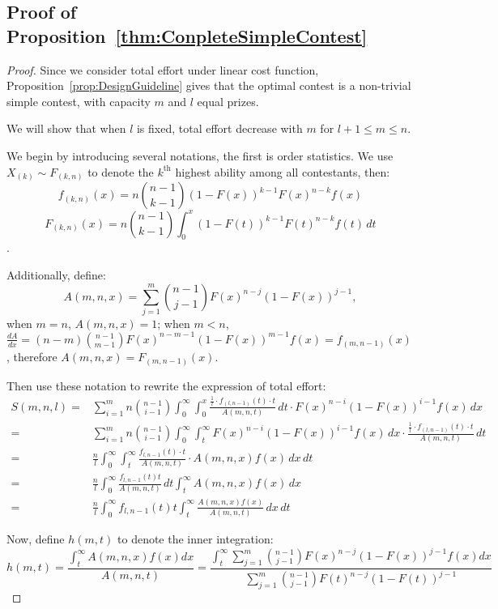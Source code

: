 \subsection*{Proof of Proposition~\ref{thm:ConpleteSimpleContest}}
\begin{proof}
    Since we consider total effort under linear cost function, Proposition~\ref{prop:DesignGuideline} gives that the optimal contest is a non-trivial simple contest, with capacity $m$ and $l$ equal prizes.

    We will show that when $l$ is fixed, total effort decrease with $m$ for $l+1\leq m\leq n$. 

    We begin by introducing several notations, the first is order statistics. We use $X_{(k)} \sim F_{(k,n)}$ to denote the $k^{\text{th}}$ highest ability among all contestants, then:
    $$f_{(k,n)}(x) = n \binom{n-1}{k-1} (1-F(x))^{k-1} F(x)^{n-k} f(x) $$
    $$F_{(k,n)}(x) = n \binom{n-1}{k-1} \int_0^x (1-F(t))^{k-1} F(t)^{n-k} f(t) \,dt $$.

    Additionally, define:
    \[
    A(m, n, x) = \sum_{j=1}^m \binom{n-1}{j-1} F(x)^{n-j} (1-F(x))^{j-1},
    \]when $m=n$, $A(m, n, x) = 1$; when $m<n$, $\frac{dA}{dx} = (n-m) \binom{n-1}{m-1} F(x)^{n-m-1} (1-F(x))^{m-1} f(x) = f_{(m,n-1)}(x)$, therefore $A(m, n, x) = F_{(m,n-1)}(x) $.

    Then use these notation to rewrite the expression of total effort:
    $$
\begin{aligned}   
S(m,n,l) = &\sum_{i=1}^m n\binom{n-1}{i-1} \int_0^{\infty} \int_0^{x} \frac{\frac{1}{l} \cdot f_{(l,n-1)}(t) \cdot t}{A(m,n,t)}\, dt \cdot F(x)^{n-i}(1-F(x))^{i-1}f(x)\,dx \\= &\sum_{i=1}^m n\binom{n-1}{i-1} \int_0^{\infty} \int_t^{\infty} F(x)^{n-i}(1-F(x))^{i-1}f(x)\,dx \cdot \frac{\frac{1}{l} \cdot f_{(l,n-1)}(t) \cdot t}{A(m,n,t)} \,dt \\=& \frac{n}{l} \int_0^{\infty} \int_t^{\infty} \frac{f_{l,n-1}(t) \cdot t}{A(m,n,t)} \cdot A(m,n,x)f(x)\,dx \,dt \\=& \frac{n}{l} \int_0^{\infty} \frac{f_{l,n-1}(t)t}{A(m,n,t)} \,dt \int_t^{\infty} A(m,n,x)f(x)\, dx \\
=& \frac{n}{l} \int_0^{\infty} f_{l,n-1}(t)t  \int_t^{\infty} \frac{A(m,n,x)f(x)}{A(m,n,t)}\, dx \, dt
\end{aligned}
$$

    Now, define $h(m,t)$ to denote the inner integration:
    \[
    h(m, t) = \frac{\int_t^\infty A(m, n, x) f(x) dx}{A(m, n, t)} = \frac{\int_t^\infty\sum_{j=1}^m \binom{n-1}{j-1} F(x)^{n-j} (1-F(x))^{j-1}f(x)dx}{\sum_{j=1}^m \binom{n-1}{j-1} F(t)^{n-j} (1-F(t))^{j-1} }
    \]


\end{proof}
